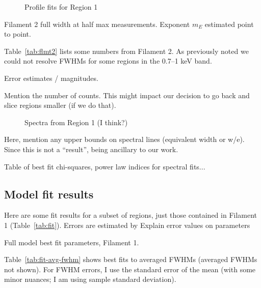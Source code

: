 \documentclass[iop, apj, numberedappendix, twocolappendix]{emulateapj}
\begin{document}
\begin{figure}
    \caption{Profile fits for Region 1}
    \label{fig:profiles}
\end{figure}


\begin{table*}[h]
\scriptsize
\centering
\caption{Filament 2 full width at half max measurements.
Exponent $m_E$ estimated point to point.\label{tab:flmt2}}

\end{table*}

Table~\ref{tab:flmt2} lists some numbers from Filament 2.  As previously noted
we could not resolve FWHMs for some regions in the 0.7--1 keV band.

Error estimates / magnitudes.

Mention the number of counts.  This might impact our decision to go back and
slice regions smaller (if we do that).


\begin{figure}
    \caption{Spectra from Region 1 (I think?)}
    \label{fig:spec}
\end{figure}

Here, mention any upper bounds on spectral lines (equivalent width or w/e).
Since this is not a ``result'', being ancillary to our work.

Table of best fit chi-squares, power law indices for spectral fits...

\subsection{Model fit results}

Here are some fit results for a subset of regions, just those contained in
Filament 1 (Table~\ref{tab:fit}).  Errors are estimated by 
Explain error values on parameters

\begin{table*}
\scriptsize
\centering
\caption{Full model best fit parameters, Filament 1.
    \label{tab:fit}}

\end{table*}

Table~\ref{tab:fit-avg-fwhm} shows best fits to averaged FWHMs (averaged FWHMs
not shown).  For FWHM errors, I use the standard error of the mean (with some
minor nuances; I am using sample standard deviation).
\end{document}
